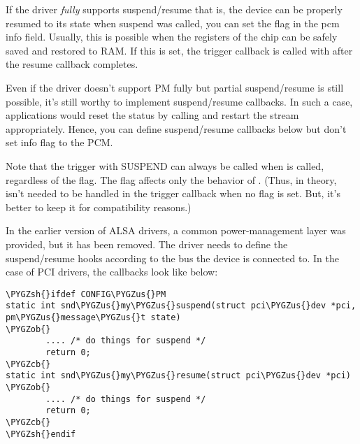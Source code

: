 \documentclass[a4paper,8pt,english]{sphinxmanual}
\def\PYGZus{\char`\_}
\def\PYGZob{\char`\{}
\def\PYGZcb{\char`\}}
\def\PYGZsh{\char`\#}
\begin{document}
If the driver \emph{fully} supports suspend/resume that is, the device can be
properly resumed to its state when suspend was called, you can set the
 flag in the pcm info field. Usually, this is
possible when the registers of the chip can be safely saved and restored
to RAM. If this is set, the trigger callback is called with
 after the resume callback completes.

Even if the driver doesn't support PM fully but partial suspend/resume
is still possible, it's still worthy to implement suspend/resume
callbacks. In such a case, applications would reset the status by
calling {\hyperref[sound/kernel\string-api/alsa\string-driver\string-api:c.snd_pcm_prepare]{\emph{}}} and restart the stream
appropriately. Hence, you can define suspend/resume callbacks below but
don't set  info flag to the PCM.

Note that the trigger with SUSPEND can always be called when
 is called, regardless of the
 flag. The  flag affects only the
behavior of . (Thus, in theory,
 isn't needed to be handled in the trigger
callback when no  flag is set. But, it's better
to keep it for compatibility reasons.)

In the earlier version of ALSA drivers, a common power-management layer
was provided, but it has been removed. The driver needs to define the
suspend/resume hooks according to the bus the device is connected to. In
the case of PCI drivers, the callbacks look like below:

\begin{Verbatim}[commandchars=\\\{\}]
\PYGZsh{}ifdef CONFIG\PYGZus{}PM
static int snd\PYGZus{}my\PYGZus{}suspend(struct pci\PYGZus{}dev *pci, pm\PYGZus{}message\PYGZus{}t state)
\PYGZob{}
        .... /* do things for suspend */
        return 0;
\PYGZcb{}
static int snd\PYGZus{}my\PYGZus{}resume(struct pci\PYGZus{}dev *pci)
\PYGZob{}
        .... /* do things for suspend */
        return 0;
\PYGZcb{}
\PYGZsh{}endif
\end{Verbatim}
\end{document}
